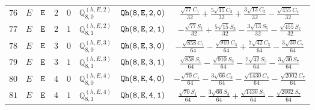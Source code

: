 \documentclass[fleqn,8pt]{jsarticle}
\begin{document}
\begin{table}[ht!]
\begin{center}
\begin{tabular}{cccccccc}
$ 76 $ & $ E $ & $ {\tt E} $ & $ 2 $ & $ 0 $ & $ \mathbb{Q}_{8,0}^{(h,E,2)} $ & $ {\tt Qh(8,E,2,0)} $ & $ \frac{\sqrt{77} C_{1}}{32} + \frac{5 \sqrt{15} C_{3}}{32} + \frac{3 \sqrt{13} C_{5}}{32} - \frac{\sqrt{455} C_{7}}{32} $ \\
$ 77 $ & $ E $ & $ {\tt E} $ & $ 2 $ & $ 1 $ & $ \mathbb{Q}_{8,1}^{(h,E,2)} $ & $ {\tt Qh(8,E,2,1)} $ & $ - \frac{\sqrt{77} S_{1}}{32} + \frac{5 \sqrt{15} S_{3}}{32} - \frac{3 \sqrt{13} S_{5}}{32} - \frac{\sqrt{455} S_{7}}{32} $ \\
$ 78 $ & $ E $ & $ {\tt E} $ & $ 3 $ & $ 0 $ & $ \mathbb{Q}_{8,0}^{(h,E,3)} $ & $ {\tt Qh(8,E,3,0)} $ & $ - \frac{\sqrt{858} C_{1}}{64} - \frac{\sqrt{910} C_{3}}{64} + \frac{7 \sqrt{42} C_{5}}{64} - \frac{3 \sqrt{30} C_{7}}{64} $ \\
$ 79 $ & $ E $ & $ {\tt E} $ & $ 3 $ & $ 1 $ & $ \mathbb{Q}_{8,1}^{(h,E,3)} $ & $ {\tt Qh(8,E,3,1)} $ & $ \frac{\sqrt{858} S_{1}}{64} - \frac{\sqrt{910} S_{3}}{64} - \frac{7 \sqrt{42} S_{5}}{64} - \frac{3 \sqrt{30} S_{7}}{64} $ \\
$ 80 $ & $ E $ & $ {\tt E} $ & $ 4 $ & $ 0 $ & $ \mathbb{Q}_{8,0}^{(h,E,4)} $ & $ {\tt Qh(8,E,4,0)} $ & $ - \frac{\sqrt{70} C_{1}}{64} - \frac{3 \sqrt{66} C_{3}}{64} - \frac{\sqrt{1430} C_{5}}{64} - \frac{\sqrt{2002} C_{7}}{64} $ \\
$ 81 $ & $ E $ & $ {\tt E} $ & $ 4 $ & $ 1 $ & $ \mathbb{Q}_{8,1}^{(h,E,4)} $ & $ {\tt Qh(8,E,4,1)} $ & $ \frac{\sqrt{70} S_{1}}{64} - \frac{3 \sqrt{66} S_{3}}{64} + \frac{\sqrt{1430} S_{5}}{64} - \frac{\sqrt{2002} S_{7}}{64} $ \\
 \hline \hline
\end{tabular}
\end{center}
\end{table}
\end{document}
